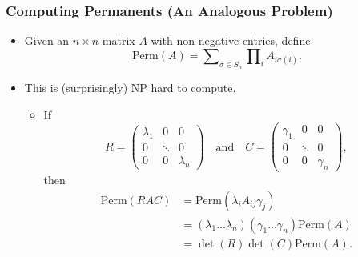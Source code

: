 \documentclass[handout,usenames,dvipsnames,12pt]{beamer}
\begin{document}


\begin{frame}
    \frametitle{Computing Permanents (An Analogous Problem)}

    \begin{itemize}
        \pause
        \item Given an $n \times n$ matrix $A$ with non-negative entries, define
        \[ \text{Perm}(A) = \sum\nolimits_{\sigma \in S_n} \prod\nolimits_i A_{i \sigma(i)}. \]
        
        \pause
        \item This is (surprisingly) NP hard to compute.

        \begin{itemize}
            \pause
            \item If
            \footnotesize
            \[ R = \begin{pmatrix} \lambda_1 & 0 & 0 \\ 0 & \ddots & 0 \\ 0 & 0 & \lambda_n \end{pmatrix} \quad\text{and}\quad C = \begin{pmatrix} \gamma_1 & 0 & 0 \\ 0 & \ddots & 0 \\ 0 & 0 & \gamma_n \end{pmatrix}, \]
            \normalsize
            then
            \begin{align*}
                \text{Perm}(RAC) &= \text{Perm}(\lambda_i A_{ij} \gamma_j)\\
                &= (\lambda_1 \dots \lambda_n) (\gamma_1 \dots \gamma_n) \text{Perm}(A)\\
                &= \det(R) \det(C) \text{Perm}(A).
            \end{align*}
        \end{itemize}
    \end{itemize}
\end{frame}
\end{document}
